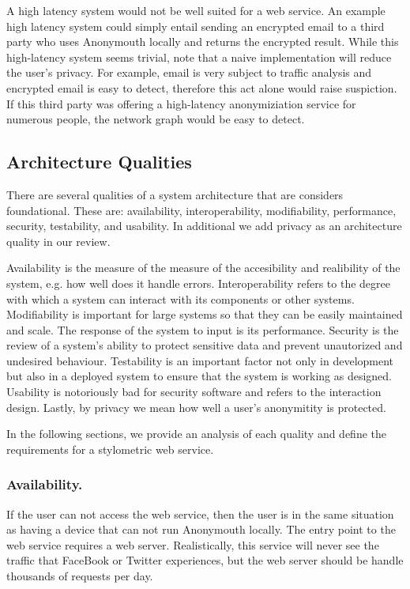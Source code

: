 \documentclass[letterpaper]{article}
\begin{document}
A high latency system would not be well suited for a web service.  An
example high latency system could simply entail sending an encrypted
email to a third party who uses Anonymouth locally and returns the
encrypted result.  While this high-latency system seems trivial, note
that a naive implementation will reduce the user's privacy.  For
example, email is very subject to traffic analysis
\cite{Mathewson04practicaltraffic} and encrypted email is easy to
detect, therefore this act alone would raise suspiction.  If
this third party was offering a high-latency anonymiziation service
for numerous people, the network graph would be easy to detect.

\subsection{Architecture Qualities}
There are several qualities of a system architecture that are
considers foundational\cite{Bass:2012:SAP:2392670}.  These are: availability,
interoperability, modifiability, performance, security, testability,
and usability.  In additional we add privacy as an architecture
quality in our review.

Availability is the measure of the measure of the accesibility and
realibility of the system, e.g. how well does it handle errors.
Interoperability refers to the degree with which a system can interact
with its components or other systems.  Modifiability is important for
large systems so that they can be easily maintained and scale.  The
response of the system to input is its performance.  Security is the
review of a system's ability to protect sensitive data and prevent
unautorized and undesired behaviour.  Testability is an important
factor not only in development but also in a deployed system to ensure
that the system is working as designed.  Usability is notoriously bad
for security software \cite{Whitten:1999:WJC:1251421.1251435} and
refers to the interaction design.  Lastly, by privacy we mean how well
a user's anonymitity is protected.

In the following sections, we provide an analysis of each quality and
define the requirements for a stylometric web service.


\subsubsection{Availability.}

If the user can not access the web service, then the user is in the
same situation as having a device that can not run Anonymouth
locally.  The entry point to the web service requires a web server.
Realistically, this service will never see the traffic that FaceBook
or Twitter experiences, but the web server should be handle thousands
of requests per day.
\end{document}
